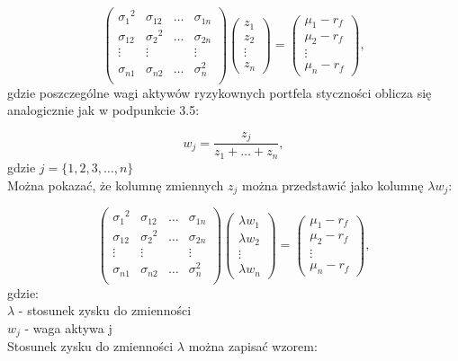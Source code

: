 \documentclass[magister]{dyplom}
\begin{document}
\begin{equation}
	\left( \begin{array}{cccc}
		{\sigma_1}^2& \sigma_{12}  & \dots & \sigma_{1n}\\
		\sigma_{12} & {\sigma_2}^2 & \dots & \sigma_{2n}\\
		\vdots 		& \vdots 	   &       & \vdots  \\
		\sigma_{n1} & \sigma_{n2}  & \dots & \sigma_{n}^2\\
	\end{array} \right)
	\left( \begin{array}{c}
		z_1\\
		z_2\\
		\vdots\\
		z_n
	\end{array} \right) =
	\left( \begin{array}{c}
		\mu_1 - r_f\\
		\mu_2 - r_f\\
		\vdots\\
		\mu_n - r_f
	\end{array} \right),
\end{equation}
gdzie poszczególne wagi aktywów ryzykownych portfela styczności oblicza się analogicznie jak w podpunkcie 3.5:

\begin{equation}
w_j = \frac{z_j}{z_1 + \dots + z_n},
\end{equation}
gdzie $j = \{1, 2, 3, \dots, n\}$\\
Można pokazać, że kolumnę zmiennych $z_j$ można przedstawić jako kolumnę ${\lambda}w_j$:

\begin{equation}
	\left( \begin{array}{cccc}
		{\sigma_1}^2& \sigma_{12}  & \dots & \sigma_{1n}\\
		\sigma_{12} & {\sigma_2}^2 & \dots & \sigma_{2n}\\
		\vdots 		& \vdots 	   &       & \vdots  \\
		\sigma_{n1} & \sigma_{n2}  & \dots & \sigma_{n}^2\\
	\end{array} \right)
	\left( \begin{array}{c}
		{\lambda}w_1\\
		{\lambda}w_2\\
		\vdots\\
		{\lambda}w_n
	\end{array} \right) =
	\left( \begin{array}{c}
		\mu_1 - r_f\\
		\mu_2 - r_f\\
		\vdots\\
		\mu_n - r_f
	\end{array} \right),
\end{equation}
gdzie:\\ 
$\lambda$ - stosunek zysku do zmienności\\
$w_j$ - waga aktywa j\\
Stosunek zysku do zmienności $\lambda$ można zapisać wzorem:
\end{document}
